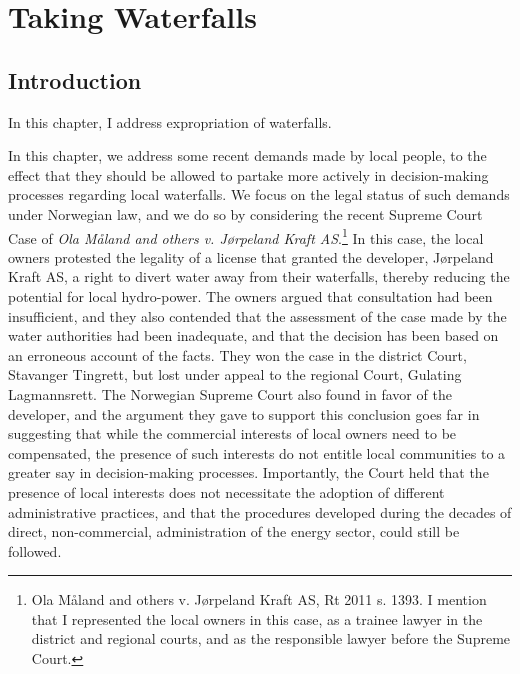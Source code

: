 \chapter{Taking Waterfalls}\label{chap:4}

\section{Introduction}\label{sec:intro4}

In this chapter, I address expropriation of waterfalls. 

In this chapter, we address some recent demands made by local people, to the effect that they should be allowed to partake more actively in decision-making processes regarding local waterfalls. We focus on the legal status of such demands under Norwegian law, and we do so by considering the recent Supreme Court Case of \emph{Ola Måland and others v. Jørpeland Kraft AS}.\footnote{Ola M{\aa}land and others v. J{\o}rpeland Kraft AS, Rt 2011 s. 1393. I mention that I represented the local owners in this case, as a trainee lawyer in the district and regional courts, and as the responsible lawyer before the Supreme Court.} In this case, the local owners protested the legality of a license that granted the developer, Jørpeland Kraft AS, a right to divert water away from their waterfalls, thereby reducing the potential for local hydro-power. The owners argued that consultation had been insufficient, and they also contended that the assessment of the case made by the water authorities had been inadequate, and that the decision has been based on an erroneous account of the facts. They won the case in the district Court, Stavanger Tingrett, but lost under appeal to the regional Court, Gulating Lagmannsrett. The Norwegian Supreme Court also found in favor of the developer, and the argument they gave to support this conclusion goes far in suggesting that while the commercial interests of local owners need to be compensated, the presence of such interests do not entitle local communities to a greater say in decision-making processes. Importantly, the Court held that the presence of local interests does not necessitate the adoption of different administrative practices, and that the procedures developed during the decades of direct, non-commercial, administration of the energy sector, could still be followed.

